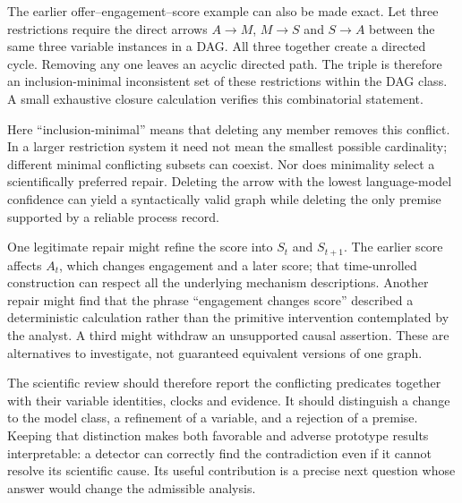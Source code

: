 The earlier offer--engagement--score example can also be made exact. Let
three restrictions require the direct arrows \(A\to M\), \(M\to S\) and
\(S\to A\) between the same three variable instances in a DAG. All three
together create a directed cycle. Removing any one leaves an acyclic
directed path. The triple is therefore an inclusion-minimal inconsistent
set of these restrictions within the DAG class. A small exhaustive
closure calculation verifies this combinatorial statement.
\citep{exec13_diagram_restrictions}

Here ``inclusion-minimal'' means that deleting any member removes this
conflict. In a larger restriction system it need not mean the smallest
possible cardinality; different minimal conflicting subsets can coexist.
Nor does minimality select a scientifically preferred repair. Deleting
the arrow with the lowest language-model confidence can yield a
syntactically valid graph while deleting the only premise supported by a
reliable process record.

One legitimate repair might refine the score into \(S_t\) and
\(S_{t+1}\). The earlier score affects \(A_t\), which changes engagement
and a later score; that time-unrolled construction can respect all the
underlying mechanism descriptions. Another repair might find that the
phrase ``engagement changes score'' described a deterministic
calculation rather than the primitive intervention contemplated by the
analyst. A third might withdraw an unsupported causal assertion. These
are alternatives to investigate, not guaranteed equivalent versions of
one graph.

The scientific review should therefore report the conflicting predicates
together with their variable identities, clocks and evidence. It should
distinguish a change to the model class, a refinement of a variable, and
a rejection of a premise. Keeping that distinction makes both favorable
and adverse prototype results interpretable: a detector can correctly
find the contradiction even if it cannot resolve its scientific cause.
Its useful contribution is a precise next question whose answer would
change the admissible analysis.
\label{exec13:restriction-development-end}
